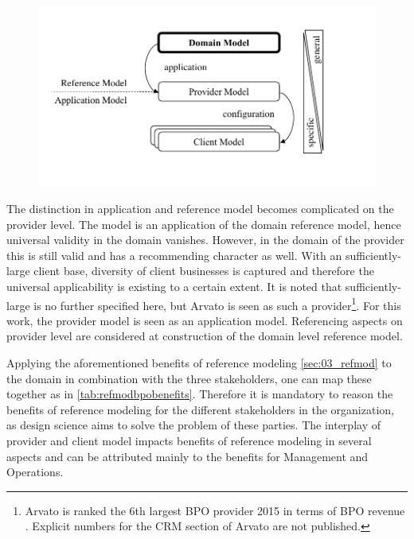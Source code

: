 \begin{figure}[caption={Model levels}, label={fig:modellevels}]
	{	\includegraphics[width=.8\textwidth]{figures/refmodlevels.pdf}}
\end{figure}

The distinction in application and reference model becomes complicated on the provider level. The model is an application of the domain reference model, hence universal validity in the domain vanishes. However, in the domain of the provider this is still valid and has a recommending character as well. With an sufficiently-large client base, diversity of client businesses is captured and therefore the universal applicability is existing to a certain extent. It is noted that sufficiently-large is no further specified here, but Arvato is seen as such a provider\footnote{Arvato is ranked the 6th largest BPO provider 2015 in terms of BPO revenue \citep{hfs2016top}. Explicit numbers for the CRM section of Arvato are not published.}. For this work, the provider model is seen as an application model. Referencing aspects on provider level are considered at construction of the domain level reference model.  

Applying the aforementioned benefits of reference modeling \ref{sec:03_refmod} to the domain in combination with the three stakeholders, one can map these together as in \Tab \ref{tab:refmodbpobenefits}. Therefore it is mandatory to reason the benefits of reference modeling for the different stakeholders in the organization, as design science aims to solve the problem of these parties. The interplay of provider and client model impacts benefits of reference modeling in several aspects and can be attributed mainly to the benefits for Management and Operations.


